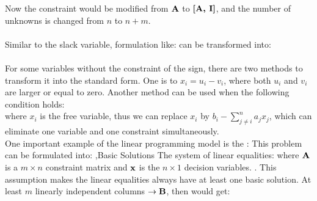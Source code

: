 \documentclass[12pt]{report}
\begin{document}
Now the constraint would be modified from $\textbf{A}$ to $\textbf{[A, I]}$, and the number of unknowns is changed from $n$ to $n+m$.\\
\\
Similar to the slack variable, formulation like:
can be transformed into:
\\
\\
For some variables without the constraint of the sign, there are two methods to transform it into the standard form. One is
to $x_i=u_i-v_i$, where both $u_i$ and $v_i$ are larger or equal to zero. Another method can be used when the following condition holds:\\
where $x_i$ is the free variable, thus we can replace $x_i$ by $b_i-\sum_{j\ne i}^n a_jx_j$, which can eliminate one variable and one constraint simultaneously.\\
One important example of the linear programming model is the :
This problem can be formulated into:
\sep{Basic Solutions}
The system of linear equalities:
where $\textbf{A}$ is a $m\times n$ constraint matrix and $\textbf{x}$ is the $n \times 1$ decision variables.
.
This assumption makes the linear equalities always have at least one basic solution.
At least $m$ linearly independent columns $\to \textbf{B}$, then would get:
\end{document}
